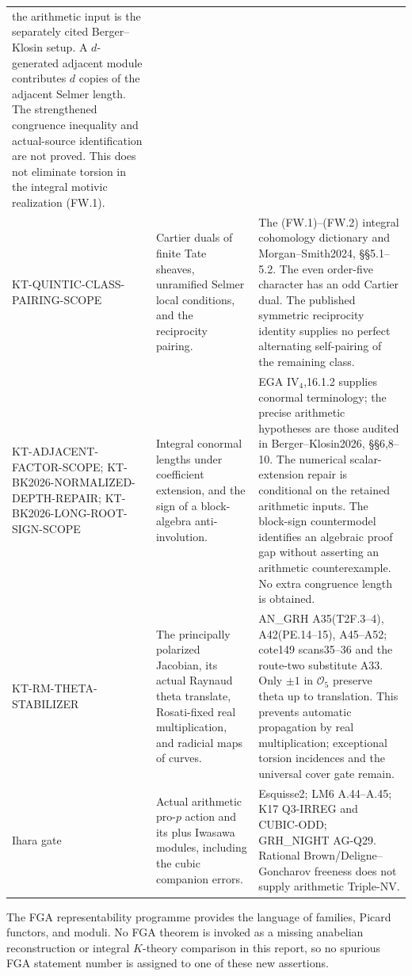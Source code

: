 \documentclass[11pt,a4paper]{article}
\theoremstyle{definition}
\begin{document}
\begin{longtable}{>{\raggedright\arraybackslash}p{}
>{\raggedright\arraybackslash}p{}
>{\raggedright\arraybackslash}p{}}
the arithmetic input is the separately cited Berger--Klosin setup.
A $d$-generated adjacent module contributes $d$ copies of the
adjacent Selmer length. The strengthened congruence inequality
and actual-source identification are not proved. This does not
eliminate torsion in the integral motivic realization (FW.1).\\
KT-QUINTIC-CLASS-PAIRING-SCOPE &
Cartier duals of finite Tate sheaves, unramified Selmer local
conditions, and the reciprocity pairing. &
The (FW.1)--(FW.2) integral cohomology dictionary and
Morgan--Smith2024, \S\S5.1--5.2.
The even order-five character has an odd Cartier dual.
The published symmetric reciprocity identity supplies no
perfect alternating self-pairing of the remaining class.\\
KT-ADJACENT-FACTOR-SCOPE;
KT-BK2026-NORMALIZED-DEPTH-REPAIR;
KT-BK2026-LONG-ROOT-SIGN-SCOPE &
Integral conormal lengths under coefficient extension,
and the sign of a block-algebra anti-involution. &
EGA IV$_4$,16.1.2 supplies conormal terminology;
the precise arithmetic hypotheses are those audited in
Berger--Klosin2026, \S\S6,8--10.
The numerical scalar-extension repair is conditional on
the retained arithmetic inputs. The block-sign countermodel
identifies an algebraic proof gap without asserting an
arithmetic counterexample. No extra congruence length is obtained.\\
KT-RM-THETA-STABILIZER &
The principally polarized Jacobian, its actual Raynaud theta
translate, Rosati-fixed real multiplication, and radicial
maps of curves. &
AN\_GRH A35(T2F.3--4), A42(PE.14--15), A45--A52;
cote149 scans35--36 and the route-two substitute A33.
Only $\pm1$ in $\mathcal O_5$ preserve theta up to translation.
This prevents automatic propagation by real multiplication;
exceptional torsion incidences and the universal cover gate remain.\\
Ihara gate &
Actual arithmetic pro-$p$ action and its plus Iwasawa modules,
including the cubic companion errors. &
Esquisse2; LM6 A.44--A.45; K17 Q3-IRREG and CUBIC-ODD;
GRH\_NIGHT AG-Q29. Rational Brown/Deligne--Goncharov
freeness does not supply arithmetic Triple-NV.\\
\bottomrule
\end{longtable}
\normalsize

The FGA representability programme provides the language of
families, Picard functors, and moduli. No FGA theorem is
invoked as a missing anabelian reconstruction or integral
$K$-theory comparison in this report, so no spurious FGA
statement number is assigned to one of these new assertions.
\end{document}

